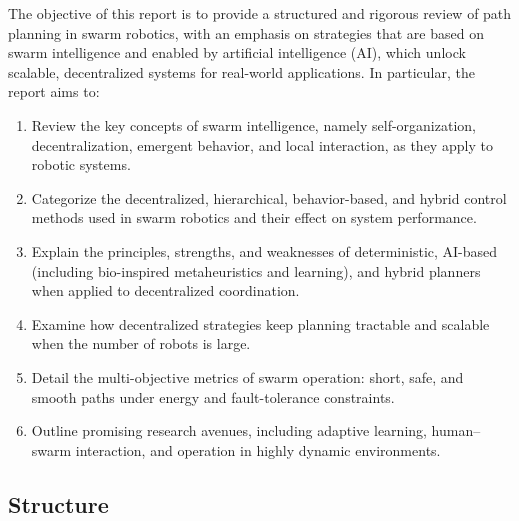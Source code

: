 The objective of this report is to provide a structured and rigorous review of
path planning in swarm robotics, with an emphasis on strategies that are based on
swarm intelligence and enabled by artificial intelligence (AI), which unlock
scalable, decentralized systems for real-world applications. In particular, the
report aims to:
\begin{enumerate}
  \item {} Review the key concepts of swarm
        intelligence, namely self-organization, decentralization, emergent
        behavior, and local interaction, as they apply to robotic systems.
  \item {} Categorize the decentralized,
        hierarchical, behavior-based, and hybrid control methods used in swarm
        robotics and their effect on system performance.
  \item {} Explain the principles,
        strengths, and weaknesses of deterministic, AI-based (including
        bio-inspired metaheuristics and learning), and hybrid planners when
        applied to decentralized coordination.
  \item {} Examine how decentralized
        strategies keep planning tractable and scalable when the number of
        robots is large.
  \item {} Detail the multi-objective metrics of
        swarm operation: short, safe, and smooth paths under energy and
        fault-tolerance constraints.
  \item {} Outline promising research avenues,
        including adaptive learning, human--swarm interaction, and operation in
        highly dynamic environments.
\end{enumerate}

\subsection{Structure}

